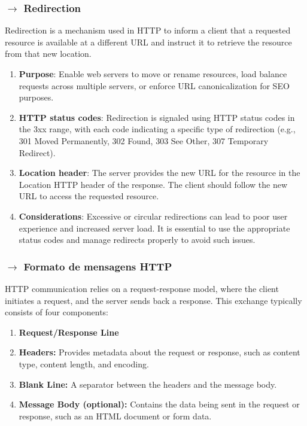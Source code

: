 \subsubsection[2.2.4 Redirection]{$\pmb{\rightarrow}$ Redirection}

Redirection is a mechanism used in HTTP to inform a client that a requested resource is available at a different URL and instruct it to retrieve the resource from that new location.

\vspace{-0.5em}
\begin{enumerate}
    \item \textbf{Purpose}: Enable web servers to move or rename resources, load balance requests across multiple servers, or enforce URL canonicalization for SEO purposes.
    \item \textbf{HTTP status codes}: Redirection is signaled using HTTP status codes in the 3xx range, with each code indicating a specific type of redirection (e.g., 301 Moved Permanently, 302 Found, 303 See Other, 307 Temporary Redirect).
    \item \textbf{Location header}: The server provides the new URL for the resource in the Location HTTP header of the response. The client should follow the new URL to access the requested resource.
    \item \textbf{Considerations}: Excessive or circular redirections can lead to poor user experience and increased server load. It is essential to use the appropriate status codes and manage redirects properly to avoid such issues.
\end{enumerate}

\clearpage
\subsubsection[2.2.5 Formato de mensagens HTTP]{$\pmb{\rightarrow}$ Formato de mensagens HTTP}

HTTP communication relies on a request-response model, where the client initiates a request, and the server sends back a response. This exchange typically consists of four components:
\begin{enumerate}
    \item \textbf{Request/Response Line}
    \item \textbf{Headers:} Provides metadata about the request or response, such as content type, content length, and encoding.
    \item \textbf{Blank Line:} A separator between the headers and the message body.
    \item \textbf{Message Body (optional):} Contains the data being sent in the request or response, such as an HTML document or form data.
\end{enumerate}

